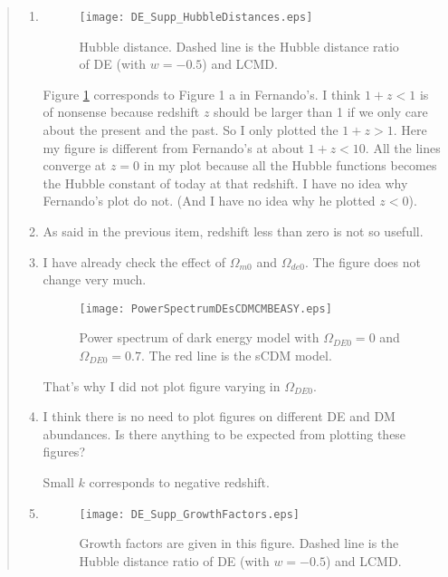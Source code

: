 \begin{quotation}
{\color{blue}


\begin{enumerate}

\item\label{item:HubbleDistance}

\begin{figure}[!htpb]
\centering
\texttt{[image: DE\_Supp\_HubbleDistances.eps]}
\caption{\color{blue}Hubble distance. Dashed line is the Hubble distance ratio of DE (with $w=-0.5$) and LCMD.}\label{fig:DE_Supp_HubbleDistances}
\end{figure}

Figure \ref{fig:DE_Supp_HubbleDistances} corresponds to Figure 1 {a} in Fernando's. I think $1+z<1$ is of nonsense because redshift $z$ should be larger than 1 if we only care about the present and the past. So I only plotted the $1+z>1$. Here my figure is different from Fernando's at about $1+z<10$. All the lines converge at $z=0$ in my plot because all the Hubble functions becomes the Hubble constant of today at that redshift. I have no idea why Fernando's plot do not. (And I have no idea why he plotted $z<0$).


\item
As said in the previous item, redshift less than zero is not so usefull.

\item
I have already check the effect of $\Omega_{m0}$ and $\Omega_{de0}$. The figure does not change very much.

\begin{figure}[!htpb]
\centering
\texttt{[image: PowerSpectrumDEsCDMCMBEASY.eps]}
\caption{\color{blue}Power spectrum of dark energy model with $\Omega_{DE0}=0$ and $\Omega_{DE0}=0.7$. The red line is the sCDM model.}
\end{figure}

That's why I did not plot figure varying in $\Omega_{DE0}$.

\item
I think there is no need to plot figures on different DE and DM abundances. Is there anything to be expected from plotting these figures?

Small $k$ corresponds to negative redshift.

\item


\begin{figure}[!htpb]
\centering
\texttt{[image: DE\_Supp\_GrowthFactors.eps]}
\caption{\color{blue}Growth factors are given in this figure. Dashed line is the Hubble distance ratio of DE (with $w=-0.5$) and LCMD.}\label{fig:DE_Supp_GrowthFactors}
\end{figure}


\end{enumerate}}
\end{quotation}

